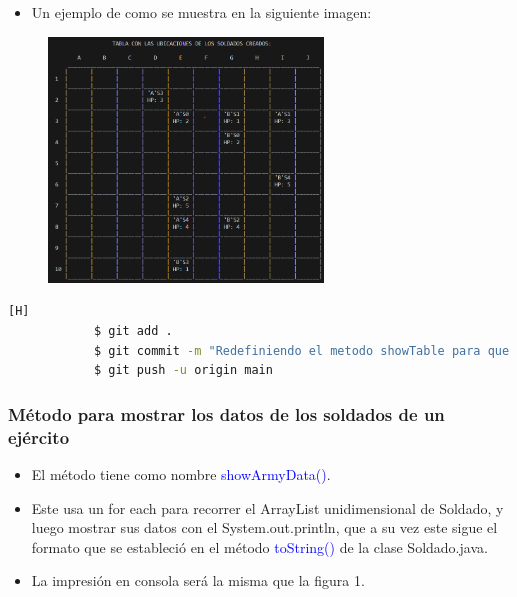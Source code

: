 \documentclass{article}
\begin{document}
        \begin{itemize}
            \begin{itemize}
                \item Un ejemplo de como se muestra en la siguiente imagen:
            \end{itemize}
        \end{itemize}

        \begin{figure}[H]
            \centering
            \includegraphics[width=0.65\textwidth,keepaspectratio]{img/showArmyTable.png}
            \caption{}
        \end{figure}

        \begin{lstlisting}[language=bash,caption={Commit \href{https://github.com/hernanchoquehuanca/fp2-23b/commit/4b6ccf86d403513981c5975cadb841d6cd541e61}{4b6ccf8}: Se adaptó e implementó el método para mostrar la tabla con los soldados de ambos ejércitos incluyendo su vida}][H]
    		$ git add .
    		$ git commit -m "Redefiniendo el metodo showTable para que ahora muestre el tablero con soldados incluyendo su vida, la cual esta representada por HP: n, siendo n el nivel de vida"
    		$ git push -u origin main
    	\end{lstlisting}
        
        
        \subsubsection{Método para mostrar los datos de los soldados de un ejército}

        \begin{itemize}
            \item El método tiene como nombre \textcolor{blue}{showArmyData()}.
            \item Este usa un for each para recorrer el ArrayList unidimensional de Soldado, y luego mostrar sus datos con el System.out.println, que a su vez este sigue el formato que se estableció en el método \textcolor{blue}{toString()} de la clase Soldado.java.
            \item La impresión en consola será la misma que la figura 1.
        \end{itemize}
\end{document}
